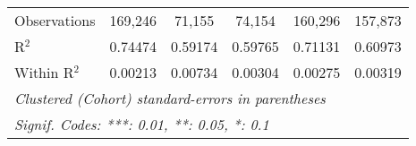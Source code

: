 \begin{table}[htbp]
\begin{tabular}{lccccc}
      Observations         & 169,246                & 71,155         & 74,154   & 160,296                & 157,873\\
      R$^2$                & 0.74474                & 0.59174        & 0.59765  & 0.71131                & 0.60973\\
      Within R$^2$         & 0.00213                & 0.00734        & 0.00304  & 0.00275                & 0.00319\\
      \midrule\midrule\multicolumn{6}{l}{\emph{Clustered (Cohort) standard-errors in parentheses}}\\
      \multicolumn{6}{l}{\emph{Signif. Codes: ***: 0.01, **: 0.05, *: 0.1}}\\
   \end{tabular}
\end{table}


